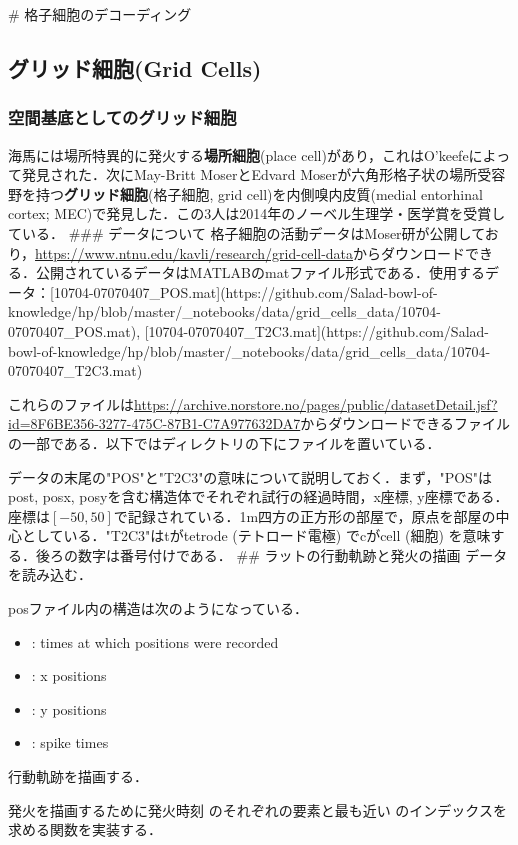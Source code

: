 # 格子細胞のデコーディング
\subsection{グリッド細胞(Grid Cells)}

\subsubsection{空間基底としてのグリッド細胞}
海馬には場所特異的に発火する\textbf{場所細胞}(place cell)があり，これはO'keefeによって発見された．次にMay-Britt MoserとEdvard Moserが六角形格子状の場所受容野を持つ\textbf{グリッド細胞}(格子細胞, grid cell)を内側嗅内皮質(medial entorhinal cortex; MEC)で発見した．この3人は2014年のノーベル生理学・医学賞を受賞している．
### データについて
格子細胞の活動データはMoser研が公開しており，\url{https://www.ntnu.edu/kavli/research/grid-cell-data}からダウンロードできる．公開されているデータはMATLABのmatファイル形式である．使用するデータ：[10704-07070407_POS.mat](https://github.com/Salad-bowl-of-knowledge/hp/blob/master/_notebooks/data/grid_cells_data/10704-07070407_POS.mat), [10704-07070407_T2C3.mat](https://github.com/Salad-bowl-of-knowledge/hp/blob/master/_notebooks/data/grid_cells_data/10704-07070407_T2C3.mat)

これらのファイルは\url{https://archive.norstore.no/pages/public/datasetDetail.jsf?id=8F6BE356-3277-475C-87B1-C7A977632DA7}からダウンロードできるファイルの一部である．以下ではディレクトリの下にファイルを置いている．

データの末尾の"POS"と"T2C3"の意味について説明しておく．まず，"POS"はpost, posx, posyを含む構造体でそれぞれ試行の経過時間，x座標, y座標である．座標は$[-50, 50]$で記録されている．1m四方の正方形の部屋で，原点を部屋の中心としている．"T2C3"はtがtetrode (テトロード電極) でcがcell (細胞) を意味する．後ろの数字は番号付けである． 
## ラットの行動軌跡と発火の描画
データを読み込む．


posファイル内の構造は次のようになっている．
\begin{itemize}
\item {}: times at which positions were recorded
\item {}: x positions
\item {}: y positions
\item {}: spike times
\end{itemize}

行動軌跡を描画する．


発火を描画するために発火時刻  のそれぞれの要素と最も近い  のインデックスを求める関数を実装する．




